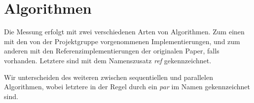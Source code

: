 \section{Algorithmen}

Die Messung erfolgt mit zwei verschiedenen Arten von Algorithmen. Zum einen mit den von der Projektgruppe vorgenommenen Implementierungen, und zum anderen mit den Referenzimplementierungen der originalen Paper, falls vorhanden. Letztere sind mit dem Namenszusatz \textit{ref} gekennzeichnet.

Wir unterscheiden des weiteren zwischen sequentiellen und parallelen Algorithmen, wobei letztere in der Regel durch ein \textit{par} im Namen gekennzeichnet sind.
